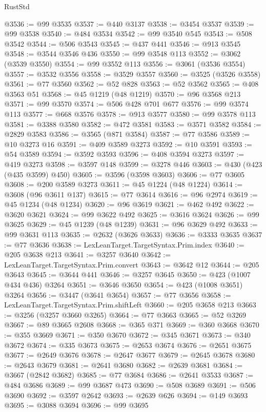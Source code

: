 \begin{lexlean}{RustStd}
\begin{coremodule}
@3536 := @99 @3535
@3537 := @440 @3137
@3538 := @3454 @3537
@3539 := @99 @3538
@3540 := @484 @3534
@3542 := @99 @3540 @545
@3543 := @508 @3542
@3544 := @506 @3543
@3545 := @437 @441
@3546 := @913 @3545
@3548 := @3544 @3546 @436
@3550 := @99 @3548 @113
@3552 := @3062 (@3539 @3550)
@3554 := @99 @3552 @113
@3556 := @3061 (@3536 @3554)
@3557 := @3532 @3556
@3558 := @3529 @3557
@3560 := @3525 (@3526 @3558)
@3561 := @77 @3560
@3562 := @52 @828
@3563 := @52 @3562
@3565 := @408 @3563 @51
@3568 := @45 @1219 (@48 @1219)
@3570 := @96 @3568 @213
@3571 := @99 @3570
@3574 := @506 @428 @701 @677
@3576 := @99 @3574 @113
@3577 := @668 @3576
@3578 := @913 @3577
@3580 := @99 @3578 @113
@3581 := @3388 @3580
@3582 := @472 @3581
@3583 := @3571 @3582
@3584 := @2829 @3583
@3586 := @3565 (@871 @3584)
@3587 := @77 @3586
@3589 := @10 @3273 @16
@3591 := @409 @3589 @3273
@3592 := @10 @3591
@3593 := @54 @3589
@3594 := @3592 @3593
@3596 := @408 @3594 @3273
@3597 := @419 @3273
@3598 := @3597 @148
@3599 := @3278 @446
@3603 := @430 (@423 (@435 @3599) @450)
@3605 := @3596 (@3598 @3603)
@3606 := @77 @3605
@3608 := @200 @3589 @3273
@3611 := @45 @1224 (@48 @1224)
@3614 := @3608 (@96 @3611 @137)
@3615 := @77 @3614
@3616 := @96 @2974
@3619 := @45 @1234 (@48 @1234)
@3620 := @96 @3619
@3621 := @462 @492
@3622 := @3620 @3621
@3624 := @99 @3622 @492
@3625 := @3616 @3624
@3626 := @99 @3625
@3629 := @45 @1239 (@48 @1239)
@3631 := @96 @3629 @492
@3633 := @99 @3631 @113
@3635 := @2632 (@3626 @3633)
@3636 := @3333 @3635
@3637 := @77 @3636
@3638 := LexLeanTarget.TargetSyntax.Prim.index
@3640 := @205 @3638 @213
@3641 := @3257 @3640
@3642 := LexLeanTarget.TargetSyntax.Prim.convert
@3643 := @3642 @12
@3644 := @205 @3643
@3645 := @3644 @441
@3646 := @3257 @3645
@3650 := @423 (@1007 @434 @436) @3264
@3651 := @3646 @3650
@3654 := @423 (@1008 @3651) @3264
@3656 := @3447 (@3641 @3654)
@3657 := @77 @3656
@3658 := LexLeanTarget.TargetSyntax.Prim.shiftLeft
@3660 := @205 @3658 @213
@3663 := @3256 (@3257 @3660 @3265)
@3664 := @77 @3663
@3665 := @52 @3269
@3667 := @89 @3665 @2608
@3668 := @365 @371
@3669 := @360 @3668
@3670 := @355 @3669
@3671 := @350 @3670
@3672 := @345 @3671
@3673 := @340 @3672
@3674 := @335 @3673
@3675 := @2653 @3674
@3676 := @2651 @3675
@3677 := @2649 @3676
@3678 := @2647 @3677
@3679 := @2645 @3678
@3680 := @2643 @3679
@3681 := @2641 @3680
@3682 := @2639 @3681
@3684 := @3667 (@2842 @3682)
@3685 := @77 @3684
@3686 := @2641 @3533
@3687 := @484 @3686
@3689 := @99 @3687 @473
@3690 := @508 @3689
@3691 := @506 @3690
@3692 := @3597 @2642
@3693 := @2639 @626
@3694 := @149 @3693
@3695 := @3088 @3694
@3696 := @99 @3695

\end{coremodule}
\end{lexlean}

